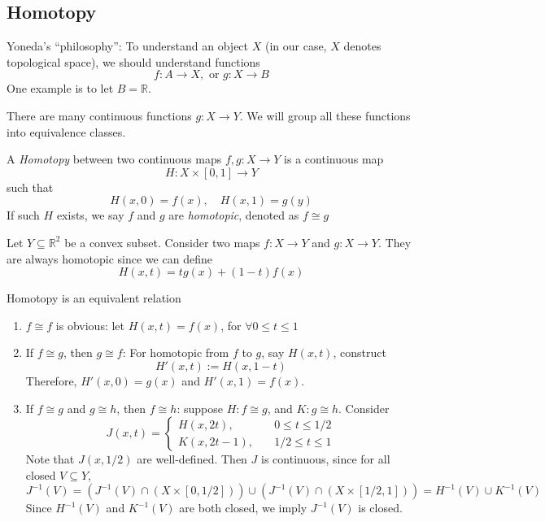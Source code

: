 \subsection{Homotopy}
Yoneda's ``philosophy'':
To understand an object $X$ (in our case, $X$ denotes topological space), we should understand functions
\[
f:A\to X,
\text{ or }
g:X\to B
\]
One example is to let $B=\mathbb{R}$.

There are many continuous functions $g:X\to Y$.
We will group all these functions into equivalence classes.

\begin{definition}[Homotopy]
A \emph{Homotopy} between two continuous maps $f,g:X\to Y$ is a continuous map
\[
H:X\times[0,1]\to Y
\]
such that 
\[
H(x,0)=f(x),\quad
H(x,1)=g(y)
\]
If such $H$ exists, we say $f$ and $g$ are \emph{homotopic}, denoted as $f\cong g$
\end{definition}

\begin{example}
Let $Y\subseteq\mathbb{R}^2$ be a convex subset.
Consider two maps $f:X\to Y$ and $g:X\to Y$.
They are always homotopic since we can define
\[
H(x,t) = tg(x) + (1-t)f(x)
\]
\end{example}

\begin{proposition}
Homotopy is an equivalent relation
\end{proposition}
\begin{enumerate}
\item
$f\cong f$ is obvious: let $H(x,t) = f(x)$, for $\forall 0\le t\le1$
\item
If $f\cong g$, then $g\cong f$:
For homotopic from $f$ to $g$, say $H(x,t)$, construct
\[
H'(x,t):=H(x,1-t)
\]
Therefore, $H'(x,0)=g(x)$ and $H'(x,1)=f(x)$.
\item
If $f\cong g$ and $g\cong h$, then $f\cong h$:
suppose $H:f\cong g$, and $K:g\cong h$.
Consider
\[
J(x,t)=\left\{
\begin{aligned}
H(x,2t),&\quad 0\le t\le1/2\\
K(x,2t-1),&\quad 1/2\le t\le 1
\end{aligned}
\right.
\]
Note that $J(x,1/2)$ are well-defined.
Then $J$ is continuous, since for all closed $V\subseteq Y$,
\[
J^{-1}(V)=(J^{-1}(V)\cap(X\times[0,1/2]))\cup(J^{-1}(V)\cap(X\times[1/2,1]))
=
H^{-1}(V)\cup K^{-1}(V)
\]
Since $H^{-1}(V)$ and $K^{-1}(V)$ are both closed, we imply $J^{-1}(V)$ is closed.
\end{enumerate}

